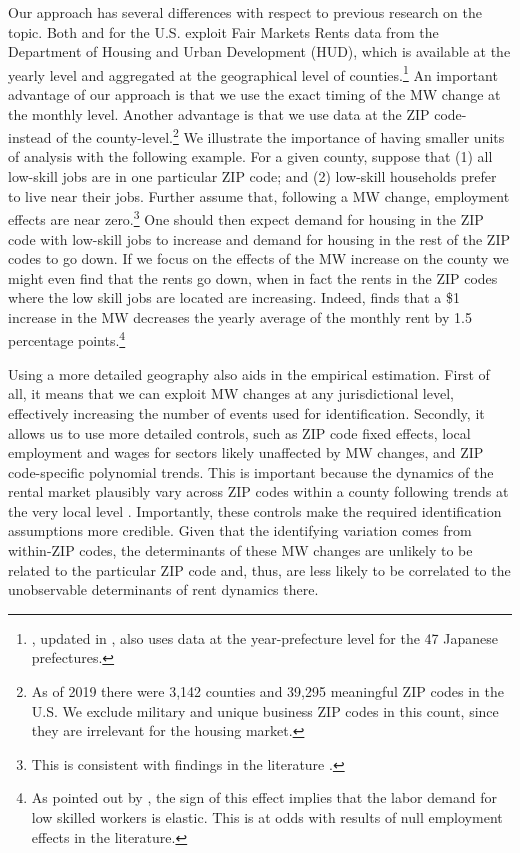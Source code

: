 Our approach has several differences with respect to previous research on the topic.
Both \textcite{Tidemann2018} and \textcite{Yamagishi2019} for the U.S. exploit Fair 
Markets Rents data from the Department of Housing and Urban Development (HUD), which is 
available at the yearly level and aggregated at the geographical level of 
counties.\footnote{\textcite{Yamagishi2019}, updated in \textcite{Yamagishi2020}, also 
	uses data at the year-prefecture level for the 47 Japanese prefectures.}
An important advantage of our approach is that we use the exact timing of the MW change 
at the monthly level.
Another advantage is that we use data at the ZIP code- instead of the 
county-level.\footnote{As of 2019 there were 3,142 counties and 39,295 meaningful ZIP 
	codes in the U.S. We exclude military and unique business ZIP codes in this count, 
	since they are irrelevant for the housing market.} 
We illustrate the importance of having smaller units of analysis with the following 
example.
For a given county, suppose that (1) all low-skill jobs are in one particular ZIP code; 
and (2) low-skill households prefer to live near their jobs. Further assume that, 
following a MW change, employment effects are near zero.\footnote{This is consistent with 
findings in the literature \parencite[for a comprehensive review see][]{Dube2019}.} 
One should then expect demand for housing in the ZIP code with low-skill jobs to increase 
and demand for housing in the rest of the ZIP codes to go down.
If we focus on the effects of the MW increase on the county we might even find that the 
rents go down, when in fact the rents in the ZIP codes where the low skill jobs are 
located are increasing.
Indeed, \textcite{Tidemann2018} finds that a \$1 increase in the MW decreases the yearly 
average of the monthly rent by 1.5 percentage points.\footnote{As pointed out by 
	\textcite{Tidemann2018}, the sign of this effect implies that the labor demand for 
	low skilled workers is elastic. This is at odds with results of null employment 
	effects in the literature.} 

Using a more detailed geography also aids in the empirical estimation.
First of all, it means that we can exploit MW changes at any jurisdictional level, 
effectively increasing the number of events used for identification.
Secondly, it allows us to use more detailed controls, such as ZIP code fixed effects, 
local employment and wages for sectors likely unaffected by MW changes, and ZIP 
code-specific polynomial trends.
This is important because the dynamics of the rental market plausibly vary across ZIP 
codes within a county following trends at the very local level 
\parencite{AlmagroDominguez2019}.
Importantly, these controls make the required identification assumptions more credible. 
Given that the identifying variation comes from within-ZIP codes, the determinants of 
these MW changes are unlikely to be related to the particular ZIP code and, thus, are 
less likely to be correlated to the unobservable determinants of rent dynamics there.

